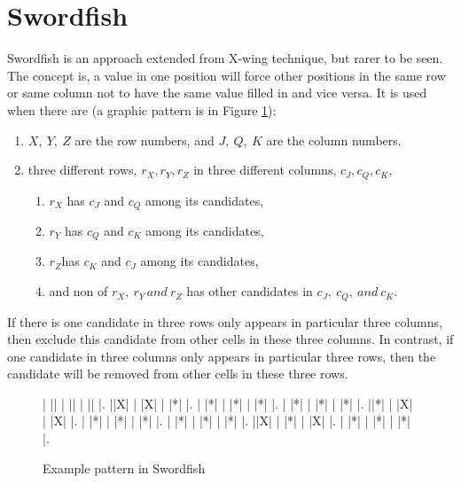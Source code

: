 \documentclass[11pt]{report}
\begin{document}
\section{Swordfish}
\label{sec:Swordfish}
Swordfish is an approach extended from X-wing technique, but rarer to be seen. The concept is, a value in one position will force other positions in the same row or same column not to have the same value filled in and vice versa. It is used when there are (a graphic pattern is in Figure \ref{fig:swordfish}):
\begin{enumerate}
\item $X,\ Y,\ Z$ are the row numbers, and $J,\ Q,\ K$ are the column numbers.
\item three different rows, $r_{X}, r_{Y}, r_{Z}$ in three different columns, $c_{J}, c_{Q}, c_{K}$,
\begin{enumerate}
\item $r_{X}$ has $c_{J}$ and $c_{Q}$ among its candidates,
\item $r_{Y}$ has $c_{Q}$ and $c_{K}$ among its candidates,
\item $r_{Z}$has $c_{K}$ and $c_{J}$ among its candidates,
\item and non of $r_{X},\ r_{Y}\, and\ r_{Z}$ has other candidates in $c_{J},\ c_{Q},\ and\ c_{K}.$
\end{enumerate}
\end{enumerate}
If there is one candidate in three rows only appears in particular three columns, then exclude this candidate from other cells in these three columns. In contrast, if one candidate in three columns only appears in particular three rows, then the candidate will be removed from other cells in these three rows.

\begin{figure}[htbp]
\begin{sudoku}
| |{}| | |{}| | |{}| |.
 |{}|X| | |X| | |*| |.
| |*| | |*| | |*| |.
| |*| | |*| | |*| |.
|{}|*| | |X| | |X| |.
| |*| | |*| | |*| |.
| |*| | |*| | |*| |.
|{}|X| | |*| | |X| |.
| |*| | |*| | |*| |.
\end{sudoku}
\caption{Example pattern in Swordfish}
\label{fig:swordfish}
\end{figure}
\end{document}
